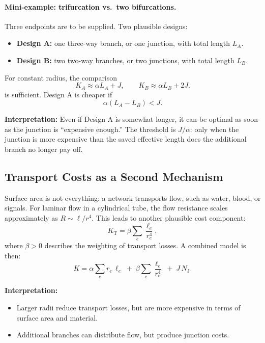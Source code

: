 \paragraph{Mini-example: trifurcation vs.\ two bifurcations.}

Three endpoints are to be supplied. Two plausible designs:
\begin{itemize}
	\item \textbf{Design A:} one three-way branch, or one junction, with total length $L_A$.
	\item \textbf{Design B:} two two-way branches, or two junctions, with total length $L_B$.
\end{itemize}
For constant radius, the comparison
\[
K_A \approx \alpha L_A + J,
\qquad
K_B \approx \alpha L_B + 2J.
\]
is sufficient.
Design A is cheaper if
\begin{equation}
	\alpha(L_A-L_B) < J.
	\label{eq:threshold_J}
\end{equation}

\textbf{Interpretation:}
Even if Design A is somewhat longer, it can be optimal as soon as the junction is ``expensive enough.''
The threshold is $J/\alpha$: only when the junction is more expensive than the saved effective length
does the additional branch no longer pay off.

\subsection{Transport Costs as a Second Mechanism}

Surface area is not everything: a network transports flow, such as water, blood, or signals.
For laminar flow in a cylindrical tube, the flow resistance scales approximately as
$R \sim \ell/r^4$.
This leads to another plausible cost component:
\begin{equation}
	K_{\text{T}} = \beta \sum_e \frac{\ell_e}{r_e^4},
	\label{eq:transport_cost}
\end{equation}
where $\beta>0$ describes the weighting of transport losses.
A combined model is then:
\begin{equation}
	K = \alpha \sum_e r_e\,\ell_e \;+\;
	\beta \sum_e \frac{\ell_e}{r_e^4}
	\;+\; J\,N_{\text{J}}.
	\label{eq:full_cost}
\end{equation}

\textbf{Interpretation:}
\begin{itemize}
	\item Larger radii reduce transport losses, but are more expensive in terms of surface area and material.
	\item Additional branches can distribute flow, but produce junction costs.
\end{itemize}

